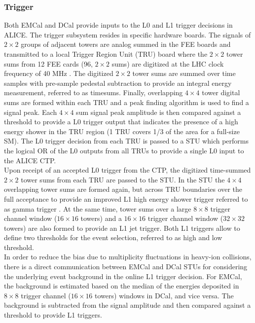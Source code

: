 \subsubsection{Trigger} 
Both EMCal and DCal  provide inputs to the L0 and L1 trigger decisions in ALICE. The trigger subsystem resides in specific hardware boards.
The signals of $2\times2$ groups of adjacent towers are analog summed in the FEE boards and transmitted to a local Trigger Region Unit (TRU) board where the 
$2\times2$ tower sums from 12 FEE cards (96, $2\times2$ sums) are digitized at the LHC clock frequency of 40 MHz \cite{Kral:2012ae}. 
The digitized $2\times2$ tower sums are summed over time samples 
with pre-sample pedestal subtraction to provide an integral energy measurement, referred to as timesums. 
Finally, overlapping $4\times4$ tower digital sums are formed within each TRU and a peak finding algorithm is used to find a signal peak.  
Each $4\times4$ sum signal peak amplitude is then compared against a threshold to provide a L0 trigger output that indicates the presence of a high energy shower in the TRU region (1 TRU covers 1/3 of the area for a full-size SM). 
The L0 trigger decision from each TRU is passed to a STU which performs the logical OR of the L0 outputs from all TRUs to provide a single L0 input to the ALICE CTP.\\
%
Upon receipt of an accepted L0 trigger from the CTP, the digitized time-summed $2\times2$ tower sums from each TRU are passed to the STU. In the STU the $4\times4$ overlapping tower sums are 
formed again, but across TRU boundaries over the full acceptance to provide an improved L1 high energy shower trigger referred to as gamma trigger \cite{Bourrion:2012vn}. 
At the same time, tower sums over a large $8\times8$ trigger channel window ($16\times16$ towers) and a
 $16\times16$ trigger channel window ($32\times32$ towers)  are also formed to provide an L1 jet trigger. Both L1 triggers allow to define two thresholds for the event selection, referred to as high and low threshold.\\
%
In order to reduce the bias due to multiplicity fluctuations in heavy-ion collisions, there is a direct  communication between  EMCal and DCal STUs for considering the underlying event background in the online L1 trigger decision.
For EMCal, the background is estimated  based on the median of the energies deposited in  $8\times8$ trigger channel ($16\times16$ towers) windows in DCal, and vice versa.
The background is subtracted from the signal amplitude and then compared against a threshold to provide L1 triggers.\\ 
